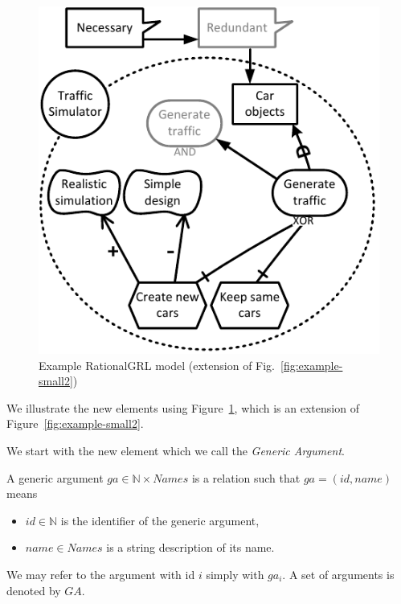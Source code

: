 \begin{figure}[ht]
\centering
\includegraphics[width=\columnwidth]{img/Example1-new-attack.pdf}
\caption{Example RationalGRL model (extension of Fig.~\ref{fig:example-small2})}
\label{fig:example-small3}
\end{figure} 

We illustrate the new elements using Figure~\ref{fig:example-small3}, which is an extension of Figure~\ref{fig:example-small2}. 

We start with the new element which we call the \emph{Generic Argument}.

\begin{definition}
\label{def:generic-argument}
A generic argument $ga \in \mathbb{N}\times Names$ is a relation such that $ga=(id, name)$ means
\begin{itemize}
\item $id\in \mathbb{N}$ is the identifier of the generic argument,
\item $name\in Names$ is a string description of its name.
\end{itemize}
We may refer to the argument with id $i$ simply with $ga_i$. A set of arguments is denoted by $GA$.
\end{definition}

